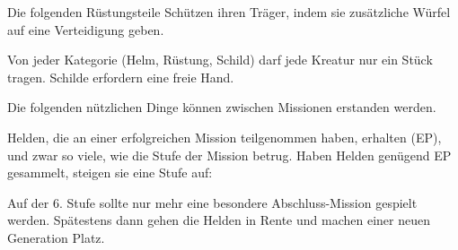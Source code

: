 {		
			Die folgenden Rüstungsteile Schützen ihren Träger, indem sie zusätzliche Würfel auf eine Verteidigung geben.


			\noindent
			Von jeder Kategorie (Helm, Rüstung, Schild) darf jede Kreatur nur ein Stück tragen. Schilde erfordern eine freie Hand.

			Die folgenden nützlichen Dinge können zwischen Missionen erstanden werden.


		Helden, die an einer erfolgreichen Mission teilgenommen haben, erhalten  (EP), und zwar so viele, wie die Stufe der Mission betrug. Haben Helden genügend EP gesammelt, steigen sie eine Stufe auf:


		\noindent
		Auf der 6. Stufe sollte nur mehr eine besondere Abschluss-Mission gespielt werden. Spätestens dann gehen die Helden in Rente und machen einer neuen Generation Platz.

}

